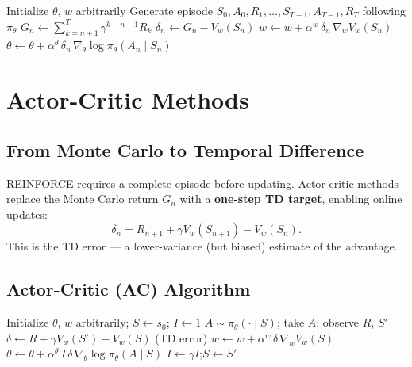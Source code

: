 \documentclass[11pt,a4paper]{article}
\theoremstyle{definition}
\theoremstyle{plain}
\theoremstyle{remark}
\begin{document}
\begin{algorithm}
\caption{REINFORCE with Baseline}
\begin{algorithmic}
\STATE Initialize $\theta$, $w$ arbitrarily
    \STATE Generate episode $S_0, A_0, R_1, \ldots, S_{T-1}, A_{T-1}, R_T$ following $\pi_\theta$
        \STATE $G_n \leftarrow \sum_{k=n+1}^{T} \gamma^{k-n-1} R_k$
        \STATE $\delta_n \leftarrow G_n - V_w(S_n)$
        \STATE $w \leftarrow w + \alpha^w\, \delta_n\, \nabla_w V_w(S_n)$
        \STATE $\theta \leftarrow \theta + \alpha^\theta\, \delta_n\, \nabla_\theta \log \pi_\theta(A_n \mid S_n)$
    \ENDFOR
\ENDWHILE
\end{algorithmic}
\end{algorithm}

\section{Actor-Critic Methods}

\subsection{From Monte Carlo to Temporal Difference}

REINFORCE requires a complete episode before updating. Actor-critic methods replace the Monte Carlo return $G_n$ with a \textbf{one-step TD target}, enabling online updates:
\[
    \delta_n = R_{n+1} + \gamma V_w(S_{n+1}) - V_w(S_n).
\]
This is the TD error — a lower-variance (but biased) estimate of the advantage.

\subsection{Actor-Critic (AC) Algorithm}

\begin{algorithm}
\caption{Actor-Critic (AC)}
\begin{algorithmic}
\STATE Initialize $\theta$, $w$ arbitrarily; $S \leftarrow s_0$; $I \leftarrow 1$
        \STATE $A \sim \pi_\theta(\cdot \mid S)$; take $A$; observe $R$, $S'$
        \STATE $\delta \leftarrow R + \gamma V_w(S') - V_w(S)$ \hfill (TD error)
        \STATE $w \leftarrow w + \alpha^w\, \delta\, \nabla_w V_w(S)$
        \STATE $\theta \leftarrow \theta + \alpha^\theta\, I\, \delta\, \nabla_\theta \log \pi_\theta(A \mid S)$
        \STATE $I \leftarrow \gamma I$;\quad $S \leftarrow S'$
    \ENDWHILE
\ENDWHILE
\end{algorithmic}
\end{algorithm}
\end{document}
